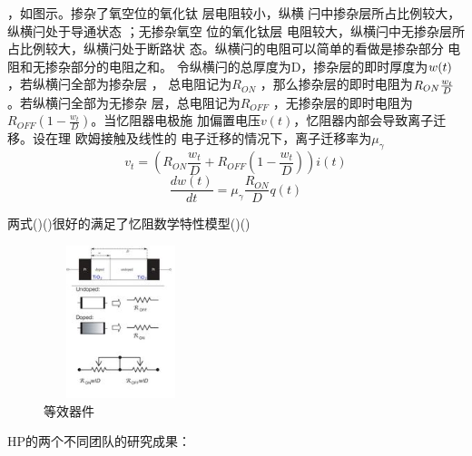 \documentclass[UTF8]{article}
\begin{document}
，如图示。掺杂了氧空位的氧化钛 层电阻较小，纵横 闩中掺杂层所占比例较大，纵横闩处于导通状态 ；无掺杂氧空 位的氧化钛层 电阻较大，纵横闩中无掺杂层所 占比例较大，纵横闩处于断路状 态。纵横闩的电阻可以简单的看做是掺杂部分 电阻和无掺杂部分的电阻之和。 令纵横闩的总厚度为D，掺杂层的即时厚度为$\mathnormal{w(t)}   $，若纵横闩全部为掺杂层 ， 总电阻记为$R_{ON}$ ，那么掺杂层的即时电阻为$R_{ON} \frac{\mathnormal{w_{t}}}{\mathnormal{D}}$。若纵横闩全部为无掺杂 层，总电阻记为$R_{OFF}$ ，无掺杂层的即时电阻为$R_{OFF}(1 - \frac{w_{t}}{D})$。当忆阻器电极施 加偏置电压$v(t)$，忆阻器内部会导致离子迁移。设在理 欧姆接触及线性的 电子迁移的情况下，离子迁移率为$\mu_{\gamma}$
\begin{equation}
v_{t} = (R_{ON} \frac{w_{t}}{D} + R_{OFF}(1 - \frac{w_{t}}{D}) ) i(t)
\end{equation}
\begin{equation}
\frac{dw(t)}{dt} = \mu_{\gamma}\frac{R_{ON}}{D}q(t)
\end{equation}

两式()()很好的满足了忆阻数学特性模型()()

\begin{figure}[htbp]
\centering
\includegraphics[width=1.77in,height=1.75in]{pic/no2.jpeg}

\caption{等效器件}
\label{fig:graph}
\end{figure}




HP的两个不同团队的研究成果：
\end{document}
